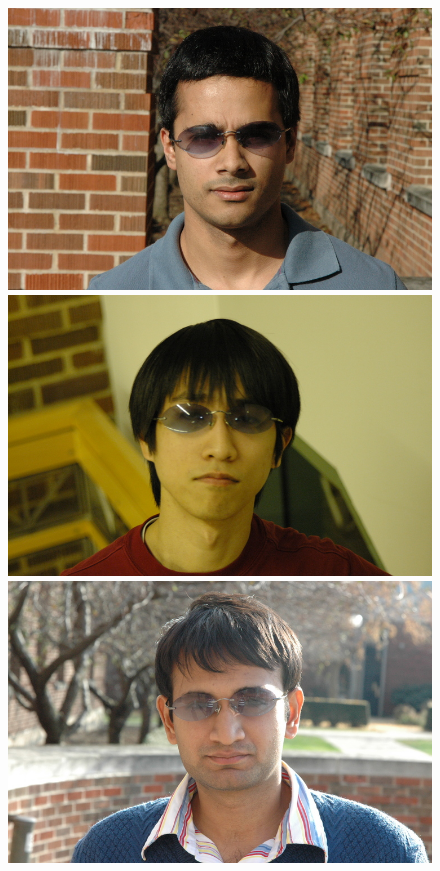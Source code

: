 \begin{figure}
\includegraphics[scale=0.35,clip=true]{figures_cvpr/examples/3/DSC_1623.jpg} 
\includegraphics[scale=0.35,clip=true]{figures_cvpr/examples/3/DSC_1652.jpg} 
\includegraphics[scale=0.35,clip=true]{figures_cvpr/examples/3/DSC_1675.jpg} 

\end{figure}
